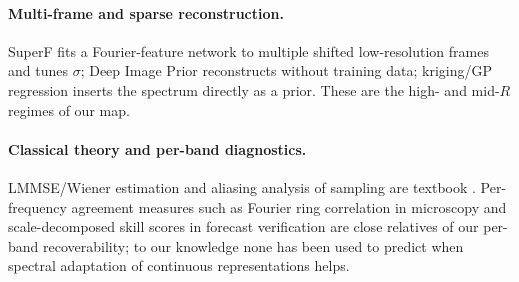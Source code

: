 \paragraph{Multi-frame and sparse reconstruction.}
SuperF \citep{superf2026} fits a Fourier-feature network to multiple shifted
low-resolution frames and tunes $\sigma$; Deep Image Prior
\citep{ulyanov2018dip} reconstructs without training data; kriging/GP
regression \citep{rasmussen2006gp} inserts the spectrum directly as a prior.
These are the high- and mid-$R$ regimes of our map.

\paragraph{Classical theory and per-band diagnostics.}
LMMSE/Wiener estimation and aliasing analysis of sampling are textbook
\citep{kay1993estimation}. Per-frequency agreement measures such as
Fourier ring correlation in microscopy \citep{vanheel2005frc} and
scale-decomposed skill scores in forecast verification are close relatives of
our per-band recoverability; to our knowledge none has been used to predict
when spectral adaptation of continuous representations helps.
